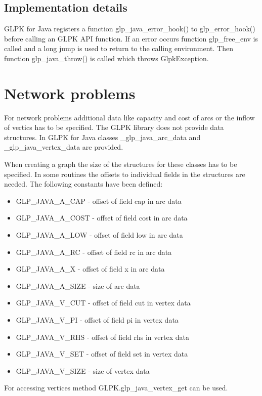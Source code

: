 \documentclass[a4paper,11pt]{report}
\begin{document}
\subsection{Implementation details}
GLPK for Java registers a function glp\_java\_error\_hook() to glp\_error\_hook()
before calling an GLPK API function. If an error occurs function glp\_free\_env
is called and a long jump is used to return to the calling environment. Then
function glp\_java\_throw() is called which throws GlpkException.

\section{Network problems}
For network problems additional data like capacity and cost of arcs or the
inflow of vertics has to be specified. The GLPK library does not provide
data structures. In GLPK for Java classes \_glp\_java\_arc\_data and
\_glp\_java\_vertex\_data are provided.

When creating a graph the size of the structures for these classes has to be
specified. In some routines the offsets to individual fields in the structures are
needed. The following constants have been defined:

\begin{itemize}
\item GLP\_JAVA\_A\_CAP  - offset of field cap in arc data
\item GLP\_JAVA\_A\_COST - offset of field cost in arc data
\item GLP\_JAVA\_A\_LOW  - offset of field low in arc data
\item GLP\_JAVA\_A\_RC   - offset of field rc in arc data
\item GLP\_JAVA\_A\_X    - offset of field x in arc data
\item GLP\_JAVA\_A\_SIZE - size of arc data
\item GLP\_JAVA\_V\_CUT  - offset of field cut in vertex data
\item GLP\_JAVA\_V\_PI   - offset of field pi in vertex data
\item GLP\_JAVA\_V\_RHS  - offset of field rhs in vertex data
\item GLP\_JAVA\_V\_SET  - offset of field set in vertex data
\item GLP\_JAVA\_V\_SIZE - size of vertex data
\end{itemize}

For accessing vertices method GLPK.glp\_java\_vertex\_get can be used.
\end{document}
